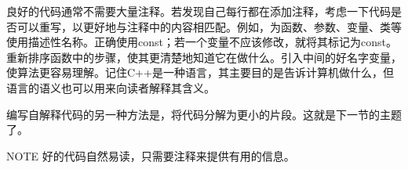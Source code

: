 
良好的代码通常不需要大量注释。若发现自己每行都在添加注释，考虑一下代码是否可以重写，以更好地与注释中的内容相匹配。例如，为函数、参数、变量、类等使用描述性名称。正确使用const；若一个变量不应该修改，就将其标记为const。重新排序函数中的步骤，使其更清楚地知道它在做什么。引入中间的好名字变量，使算法更容易理解。记住C++是一种语言，其主要目的是告诉计算机做什么，但语言的语义也可以用来向读者解释其含义。

编写自解释代码的另一种方法是，将代码分解为更小的片段。这就是下一节的主题了。

\begin{myNotic}{NOTE}
好的代码自然易读，只需要注释来提供有用的信息。
\end{myNotic}




















